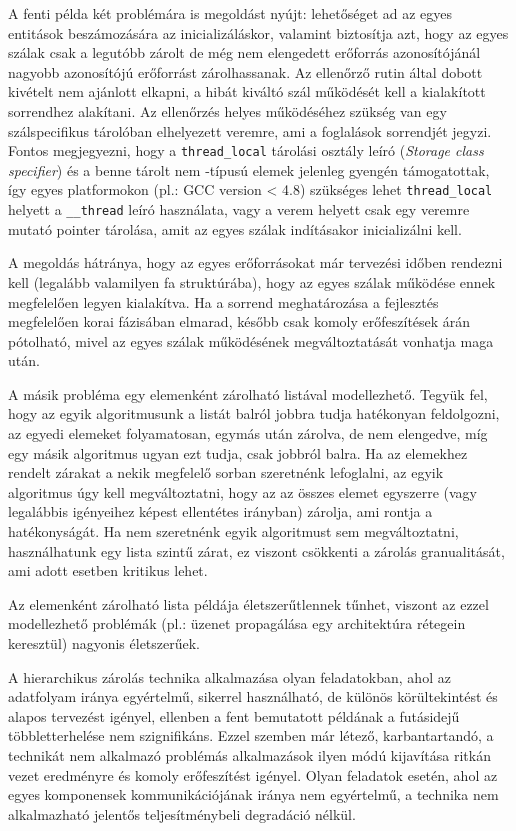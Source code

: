     
    A fenti példa két problémára is megoldást nyújt: lehetőséget ad az egyes entitások beszámozására az inicializáláskor, valamint biztosítja azt, hogy az egyes szálak csak a legutóbb zárolt de még nem elengedett erőforrás azonosítójánál nagyobb azonosítójú erőforrást zárolhassanak. Az ellenőrző rutin által dobott kivételt nem ajánlott elkapni, a hibát kiváltó szál működését kell a kialakított sorrendhez alakítani. Az ellenőrzés helyes működéséhez szükség van egy szálspecifikus tárolóban elhelyezett veremre, ami a foglalások sorrendjét jegyzi. Fontos megjegyezni, hogy a \texttt{thread\_local} tárolási osztály leíró (\emph{Storage class specifier}) és a benne tárolt nem \cite{C++11/POD}-típusú elemek jelenleg gyengén támogatottak, így egyes platformokon (pl.: GCC version < 4.8) szükséges lehet \texttt{thread\_local} helyett a \texttt{\_\_thread} leíró használata, vagy a verem helyett csak egy veremre mutató pointer tárolása, amit az egyes szálak indításakor inicializálni kell.
    
    A megoldás hátránya, hogy az egyes erőforrásokat már tervezési időben rendezni kell (legalább valamilyen fa struktúrába), hogy az egyes szálak működése ennek megfelelően legyen kialakítva. Ha a sorrend meghatározása a fejlesztés megfelelően korai fázisában elmarad, később csak komoly erőfeszítések árán pótolható, mivel az egyes szálak működésének megváltoztatását vonhatja maga után. 
    
    A másik probléma egy elemenként zárolható listával modellezhető. Tegyük fel, hogy az egyik algoritmusunk a listát balról jobbra tudja hatékonyan feldolgozni, az egyedi elemeket folyamatosan, egymás után zárolva, de nem elengedve, míg egy másik algoritmus ugyan ezt tudja, csak jobbról balra. Ha az elemekhez rendelt zárakat a nekik megfelelő sorban szeretnénk lefoglalni, az egyik algoritmus úgy kell megváltoztatni, hogy az az összes elemet egyszerre (vagy legalábbis igényeihez képest ellentétes irányban) zárolja, ami rontja a hatékonyságát. Ha nem szeretnénk egyik algoritmust sem megváltoztatni, használhatunk egy lista szintű zárat, ez viszont csökkenti a zárolás granualitását, ami adott esetben kritikus lehet.
    
    Az elemenként zárolható lista példája életszerűtlennek tűnhet, viszont az ezzel modellezhető problémák (pl.: üzenet propagálása egy architektúra rétegein keresztül) nagyonis életszerűek.
    
    A hierarchikus zárolás technika alkalmazása olyan feladatokban, ahol az adatfolyam iránya egyértelmű, sikerrel használható, de különös körültekintést és alapos tervezést igényel, ellenben a fent bemutatott példának a futásidejű többletterhelése nem szignifikáns. Ezzel szemben már létező, karbantartandó, a technikát nem alkalmazó problémás alkalmazások ilyen módú kijavítása ritkán vezet eredményre és komoly erőfeszítést igényel. Olyan feladatok esetén, ahol az egyes komponensek kommunikációjának iránya nem egyértelmű, a technika nem alkalmazható jelentős teljesítménybeli degradáció nélkül.
    
